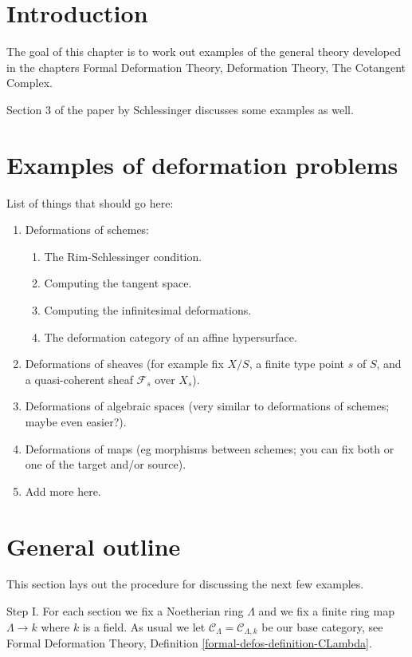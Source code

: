 \section{Introduction}
\label{examples-defos-section-introduction}
The goal of this chapter is to work out examples of the general theory
developed in the chapters Formal Deformation Theory,
Deformation Theory, The Cotangent Complex.

\medskip\noindent
Section 3 of the paper \cite{Sch} by Schlessinger discusses some
examples as well.

\section{Examples of deformation problems}
\label{examples-defos-section-examples}
List of things that should go here:
\begin{enumerate}
\item Deformations of schemes:
\begin{enumerate}
\item The Rim-Schlessinger condition.
\item Computing the tangent space.
\item Computing the infinitesimal deformations.
\item The deformation category of an affine hypersurface.
\end{enumerate}
\item Deformations of sheaves (for example fix $X/S$, a finite type point
$s$ of $S$, and a quasi-coherent sheaf $\mathcal{F}_s$ over $X_s$).
\item Deformations of algebraic spaces (very similar to deformations
of schemes; maybe even easier?).
\item Deformations of maps (eg morphisms between schemes; you can fix
both or one of the target and/or source).
\item Add more here.
\end{enumerate}

\section{General outline}
\label{examples-defos-section-general}
This section lays out the procedure for discussing the next few examples.

\medskip\noindent
Step I. For each section we fix a Noetherian ring $\Lambda$ and
we fix a finite ring map $\Lambda \to k$ where $k$ is a field.
As usual we let $\mathcal{C}_\Lambda = \mathcal{C}_{\Lambda, k}$
be our base category, see
Formal Deformation Theory,
Definition \ref{formal-defos-definition-CLambda}.

